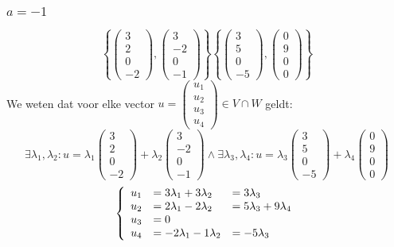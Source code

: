 \documentclass[lineaire_algebra_oplossingen.tex]{subfiles}
\begin{document}
\subsubsection*{$a=-1$}
\[
\left\lbrace
\begin{pmatrix}
3\\2\\0\\-2
\end{pmatrix}
,
\begin{pmatrix}
3\\-2\\0\\-1
\end{pmatrix}
\right\rbrace
\left\lbrace
\begin{pmatrix}
3\\5\\0\\-5
\end{pmatrix}
,
\begin{pmatrix}
0\\9\\0\\0
\end{pmatrix}
\right\rbrace
\]
We weten dat voor elke vector $u = \begin{pmatrix}
u_1\\u_2\\u_3\\u_4
\end{pmatrix} \in V\cap W$ geldt:
\[\exists \lambda_1,\lambda_2 :u = 
\lambda_1
\begin{pmatrix}
3\\2\\0\\-2
\end{pmatrix} + 
\lambda_2
\begin{pmatrix}
3\\-2\\0\\-1
\end{pmatrix}
\wedge
\exists \lambda_3,\lambda_4 :u = 
\lambda_3
\begin{pmatrix}
3\\5\\0\\-5
\end{pmatrix} + 
\lambda_4
\begin{pmatrix}
0\\9\\0\\0
\end{pmatrix}
\]
\[
\left\lbrace
\begin{array}{r l l}
u_1 &= 3\lambda_1+3\lambda_2 &= 3\lambda_3\\
u_2 &= 2\lambda_1-2\lambda_2 &= 5\lambda_3+9\lambda_4\\
u_3 &= 0\\
u_4 &= -2\lambda_1 -1\lambda_2 &= -5\lambda_3
\end{array}
\right.
\]
\end{document}
